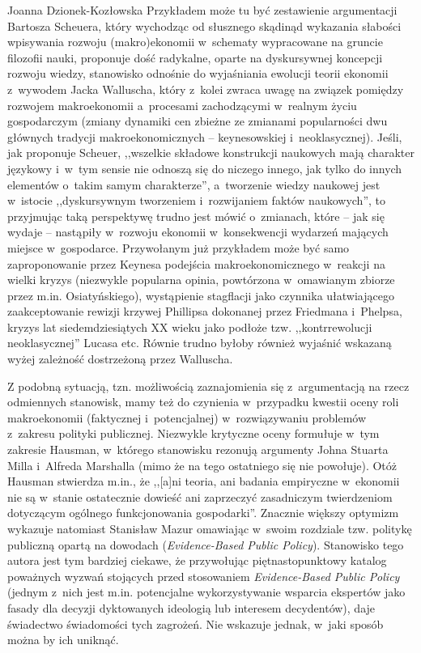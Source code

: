 \begin{recplenv}{Joanna Dzionek-Kozłowska}
Przykładem może tu być zestawienie argumentacji Bartosza Scheuera, który wychodząc od słusznego skądinąd wykazania
słabości wpisywania rozwoju (makro)ekonomii w~schematy wypracowane na gruncie filozofii nauki, proponuje dość
radykalne, oparte na dyskursywnej koncepcji rozwoju wiedzy, stanowisko odnośnie do wyjaśniania ewolucji teorii ekonomii
z~wywodem Jacka Walluscha, który z~kolei zwraca uwagę na związek pomiędzy rozwojem makroekonomii a~procesami
zachodzącymi w~realnym życiu gospodarczym (zmiany dynamiki cen zbieżne ze zmianami popularności dwu głównych tradycji
makroekonomicznych -- keynesowskiej i~neoklasycznej). Jeśli, jak proponuje Scheuer, ,,wszelkie składowe konstrukcji
naukowych mają charakter językowy i~w~tym sensie nie odnoszą się do niczego innego, jak tylko do innych
elementów o~takim samym charakterze'', a~tworzenie wiedzy naukowej jest w~istocie ,,dyskursywnym tworzeniem i~rozwijaniem faktów
naukowych'', to przyjmując taką perspektywę trudno jest mówić o~zmianach, które -- jak się wydaje -- nastąpiły w~rozwoju
ekonomii w~konsekwencji wydarzeń mających miejsce w~gospodarce. Przywołanym już przykładem może być samo zaproponowanie
przez Keynesa podejścia makroekonomicznego w~reakcji na wielki kryzys (niezwykle popularna opinia,
powtórzona w~omawianym zbiorze przez m.in. Osiatyńskiego), wystąpienie stagflacji jako czynnika
ułatwiającego zaakceptowanie rewizji
krzywej Phillipsa dokonanej przez Friedmana i~Phelpsa, kryzys lat siedemdziesiątych XX wieku jako podłoże tzw.
,,kontrrewolucji neoklasycznej'' Lucasa etc. Równie trudno byłoby również wyjaśnić wskazaną wyżej zależność dostrzeżoną
przez Walluscha.

\enlargethispage{.5\baselineskip}

Z podobną sytuacją, tzn. możliwością zaznajomienia się z~argumentacją na rzecz odmiennych stanowisk, mamy też do
czynienia w~przypadku kwestii oceny roli makroekonomii (faktycznej i~potencjalnej) w~rozwiązywaniu problemów z~zakresu
polityki publicznej. Niezwykle krytyczne oceny formułuje w~tym zakresie Hausman, w~którego stanowisku rezonują
argumenty Johna Stuarta Milla i~Alfreda Marshalla (mimo że na tego ostatniego się nie powołuje). Otóż Hausman stwierdza
m.in., że ,,[a]ni teoria, ani badania empiryczne w~ekonomii nie są w~stanie ostatecznie dowieść ani zaprzeczyć
zasadniczym twierdzeniom dotyczącym ogólnego funkcjonowania gospodarki''. Znacznie większy optymizm wykazuje natomiast
Stanisław Mazur omawiając w~swoim rozdziale tzw. politykę publiczną opartą na dowodach (\textit{Evidence-Based Public
Policy}). Stanowisko tego autora jest tym bardziej ciekawe, że przywołując piętnastopunktowy katalog poważnych wyzwań
stojących przed stosowaniem \textit{Evidence-Based Public Policy} (jednym z~nich jest m.in. potencjalne wykorzystywanie
wsparcia ekspertów jako fasady dla decyzji dyktowanych ideologią lub interesem decydentów), daje świadectwo świadomości
tych zagrożeń. Nie wskazuje jednak, w~jaki sposób można by ich uniknąć.


\end{recplenv}
